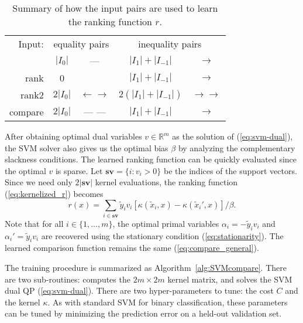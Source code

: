\documentclass{article}
\newcommand{\RR}{\mathbb R}
\begin{document}
\begin{table}[b!]
  \centering
  \begin{tabular}{r|cc|cc|}
Input:&    \multicolumn{2}{c|}{equality pairs}
&    \multicolumn{2}{c|}{inequality pairs}\\
    & $|I_0|$ %
    & --- 
    & $|I_1|+|I_{-1}|$ %
    & $\rightarrow$
    \\
    \hline
    rank 
    & 0 
    & 
    & $|I_1|+|I_{-1}|$ 
    & $\rightarrow$ 
    \\
    \hline
    rank2 
    & $2|I_0|$ 
    & $\leftarrow \rightarrow$
    & $2(|I_1|+|I_{-1}|)$ 
    & $\rightarrow \rightarrow$
    \\
    \hline
    compare 
    & $2|I_0|$ 
    & --- --- 
    & $|I_1|+|I_{-1}|$ 
    & $\rightarrow$\\
    \hline
  \end{tabular}
  \caption{\label{tab:models}
    Summary of how the input pairs are used to learn the ranking 
    function $r$.}
\end{table}

After obtaining optimal dual variables $v\in\RR^m$ as the solution of
(\ref{eq:svm-dual}), the SVM solver also gives us the optimal bias
$\beta$ by analyzing the complementary slackness conditions.
The learned ranking function can be quickly evaluated since the
optimal $v$ is sparse. Let $\textbf{sv}=\{i: v_i > 0\}$ be the indices
of the support vectors. Since we need only $2|\textbf{sv}|$ kernel
evaluations, the ranking function (\ref{eq:kernelized_r}) becomes
\begin{equation}
  \label{eq:r_sv}
  r(x)= 
  \sum_{i\in \textbf{sv}}
  \tilde y_i v_i\left[ 
    \kappa(\tilde x_i, x)
    - \kappa(\tilde x_i', x)
  \right]/\beta.
\end{equation}
Note that for all $i\in\{1,\dots,m\}$, the optimal primal variables
$\alpha_i=-\tilde y_i v_i$ and $\alpha_i'=\tilde y_i v_i$ are
recovered using the stationary condition (\ref{eq:stationarity}). The
learned comparison function remains the same (\ref{eq:compare_general}).

The training procedure is summarized as Algorithm~\ref{alg:SVMcompare}.
There are two sub-routines:  computes
the $2m\times 2m$ kernel matrix, and  solves the SVM
dual QP (\ref{eq:svm-dual}). There are two hyper-parameters to tune:
the cost $C$ and the kernel $\kappa$. As with standard SVM for binary
classification, these parameters can be tuned by minimizing the
prediction error on a held-out validation set.
\end{document}
